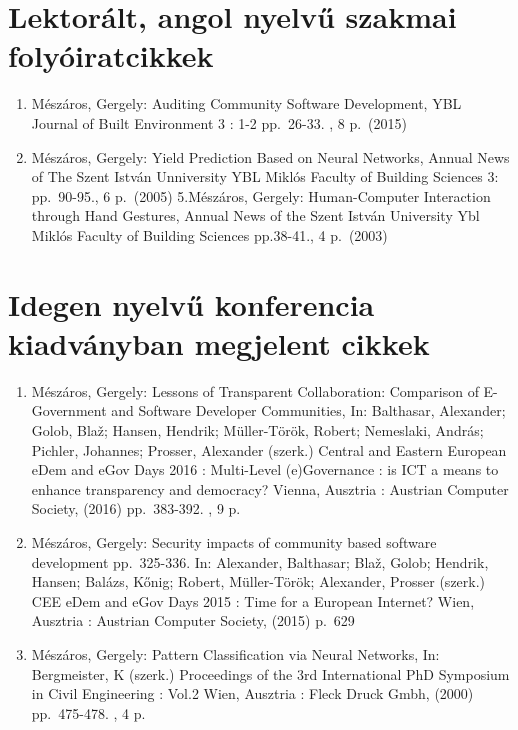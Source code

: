 \documentclass[12pt,magyar,a4paper,oneside]{scrreprt}
\providecommand{\tightlist}{%
  \setlength{\itemsep}{0pt}\setlength{\parskip}{0pt}}
\begin{document}
\hypertarget{lektoruxe1lt-angol-nyelvux171-szakmai-folyuxf3iratcikkek}{%
\section*{Lektorált, angol nyelvű szakmai
folyóiratcikkek}\label{lektoruxe1lt-angol-nyelvux171-szakmai-folyuxf3iratcikkek}}

\begin{enumerate}
\def\labelenumi{\arabic{enumi}.}
\tightlist
\item
  Mészáros, Gergely: Auditing Community Software Development, YBL
  Journal of Built Environment 3 : 1-2 pp.~26-33. , 8 p.~(2015)
\item
  Mészáros, Gergely: Yield Prediction Based on Neural Networks, Annual
  News of The Szent István Unniversity YBL Miklós Faculty of Building
  Sciences 3: pp.~90-95., 6 p.~(2005) 5.Mészáros, Gergely:
  Human-Computer Interaction through Hand Gestures, Annual News of the
  Szent István University Ybl Miklós Faculty of Building Sciences
  pp.38-41., 4 p.~(2003)
\end{enumerate}

\hypertarget{idegen-nyelvux171-konferencia-kiadvuxe1nyban-megjelent-cikkek}{%
\section*{Idegen nyelvű konferencia kiadványban megjelent
cikkek}\label{idegen-nyelvux171-konferencia-kiadvuxe1nyban-megjelent-cikkek}}

\begin{enumerate}
\def\labelenumi{\arabic{enumi}.}
\item
  Mészáros, Gergely: Lessons of Transparent Collaboration: Comparison of
  E-Government and Software Developer Communities, In: Balthasar,
  Alexander; Golob, Blaž; Hansen, Hendrik; Müller-Török, Robert;
  Nemeslaki, András; Pichler, Johannes; Prosser, Alexander (szerk.)
  Central and Eastern European e\textbar Dem and e\textbar Gov Days 2016
  : Multi-Level (e)Governance : is ICT a means to enhance transparency
  and democracy? Vienna, Ausztria : Austrian Computer Society, (2016)
  pp.~383-392. , 9 p.
\item
  Mészáros, Gergely: Security impacts of community based software
  development pp.~325-336. In: Alexander, Balthasar; Blaž, Golob;
  Hendrik, Hansen; Balázs, Kőnig; Robert, Müller-Török; Alexander,
  Prosser (szerk.) CEE e\textbar Dem and e\textbar Gov Days 2015 : Time
  for a European Internet? Wien, Ausztria : Austrian Computer Society,
  (2015) p.~629
\item
  Mészáros, Gergely: Pattern Classification via Neural Networks, In:
  Bergmeister, K (szerk.) Proceedings of the 3rd International PhD
  Symposium in Civil Engineering : Vol.2 Wien, Ausztria : Fleck Druck
  Gmbh, (2000) pp.~475-478. , 4 p.
\end{enumerate}
\end{document}
